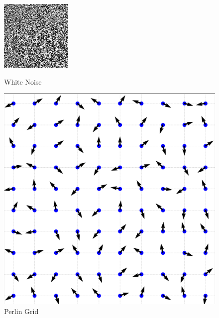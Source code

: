 \begin{figure}[H]
    \centering
    \begin{minipage}[t]{0.45\textwidth}
        \centering
        \includegraphics[width=\textwidth]{images/white_noise.png}
        \caption{White Noise}
        \label{fig:white_noise}
    \end{minipage}
    \hfill
    \begin{minipage}[t]{0.45\textwidth}
        \centering
        \includegraphics[width=\textwidth]{images/perlin_grid.png}
        \caption{Perlin Grid}
        \label{fig:perlin_grid}
    \end{minipage}
\end{figure}


